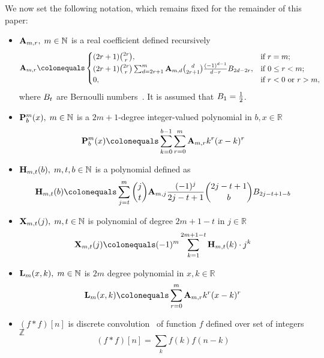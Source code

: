 We now set the following notation, which remains fixed for the remainder of this paper:
\begin{itemize}
    \item ${\mathbf{A}} \sb{m,r}, \; m\in\mathbb{N}$ is a real coefficient defined recursively
    \begin{equation}
        \label{eq:def_coeff_a}
        \coeffA{m}{r} \colonequals
        \begin{cases}
        (2r+1)
            \binom{2r}{r}, & \text{if } r=m; \\
            (2r+1) \binom{2r}{r} \sum_{d=2r+1}^{m} \coeffA{m}{d} \binom{d}{2r+1} \frac{(-1)^{d-1}}{d-r}
            \bernoulli{2d-2r}, & \text{if } 0 \leq r<m; \\
            0, & \text{if } r<0 \text{ or } r>m,
        \end{cases}
    \end{equation}
    where ${B}\sb{t}$ are Bernoulli numbers~\cite{WeissteinBernoulli}.
    It is assumed that ${B}\sb{1}=\frac{1}{2}$.

    \item ${\mathbf{P}}\sp{m} \sb{b}(x), \; m\in\mathbb{N}$ is a $2m+1$-degree integer-valued polynomial in $b,x\in\mathbb{R}$
    \begin{equation}
        \label{eq:def_polynomial_p}
        \polynomialP{m}{b}{x} \colonequals \sum_{k=0}^{b-1} \sum_{r=0}^{m} \coeffA{m}{r} k^r(x-k)^r
    \end{equation}

    \item ${\mathbf{H}} \sb{m,t} (b), \; m,t,b\in\mathbb{N}$ is a polynomial defined as
    \begin{equation}
        \label{eq:def_coeff_h}
        \coeffH{m}{t}{b}
        \colonequals
        \sum_{j=t}^{m} \binom{j}{t} \coeffA{m}{j} \frac{(-1)^j}{2j-t+1} \binom{2j-t+1}{b} \bernoulli{2j-t+1-b}
    \end{equation}

    \item ${\mathbf{X}}\sb{m,t} (j), \; m,t\in\mathbb{N}$ is polynomial of degree $2m+1-t$ in $j\in\mathbb{R}$
    \begin{equation}
        \label{eq:def_coeff_x}
        \polynomialX{m}{t}{j} \colonequals (-1)^m \sum_{k=1}^{2m+1-t} \coeffH{m}{t}{k} \cdot j^k
    \end{equation}

    \item ${\mathbf{L}}\sb{m}(x,k), \; m\in\mathbb{N}$ is $2m$ degree polynomial in $x,k\in\mathbb{R}$
    \begin{equation}
        \label{eq:def_polynomial_l}
        \polynomialL{m}{x}{k} \colonequals \sum_{r=0}^{m} \coeffA{m}{r} k^r(x-k)^r
    \end{equation}

    \item $(f\ast f)[n]$ is discrete convolution~\cite{DiscConv} of function $f$ defined over set of integers $\mathbb{Z}$
    \[
        (f\ast f)[n] = \sum_{k} f(k) f(n-k)
    \]


\end{itemize}